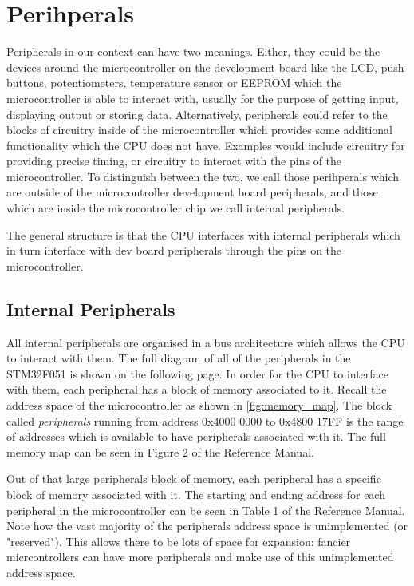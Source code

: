 \chapter{Perihperals}
Peripherals in our context can have two meanings. Either, they could be the devices around the microcontroller on the development board like the LCD, push-buttons, potentiometers, temperature sensor or EEPROM which the microcontroller is able to interact with, usually for the purpose of getting input, displaying output or storing data. Alternatively, peripherals could refer to the blocks of circuitry inside of the microcontroller which provides some additional functionality which the CPU does not have. Examples would include circuitry for providing precise timing, or circuitry to interact with the pins of the microcontroller. To distinguish between the two, we call those perihperals which are outside of the microcontroller development board peripherals, and those which are inside the microcontroller chip we call internal peripherals. 

The general structure is that the CPU interfaces with internal peripherals which in turn interface with dev board peripherals through the pins on the microcontroller.

\section{Internal Peripherals}
All internal peripherals are organised in a bus architecture which allows the CPU to interact with them. The full diagram of all of the peripherals in the STM32F051 is shown on the following page.
\afterpage{
  \centering
  
}
In order for the CPU to interface with them, each peripheral has a block of memory associated to it. Recall the address space of the microcontroller as shown in \autoref{fig:memory_map}. The block called \emph{peripherals} running from address 0x4000 0000 to 0x4800 17FF is the range of addresses which is available to have peripherals associated with it. The full memory map can be seen in Figure 2 of the Reference Manual. 

Out of that large peripherals block of memory, each peripheral has a specific block of memory associated with it. The starting and ending address for each peripheral in the microcontroller can be seen in Table 1 of the Reference Manual. Note how the vast majority of the peripherals address space is unimplemented (or "reserved"). This allows there to be lots of space for expansion: fancier micrcontrollers can have more peripherals and make use of this unimplemented address space. 

